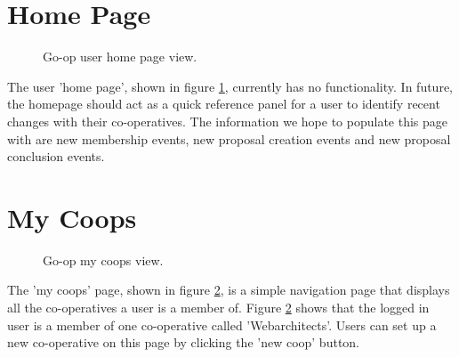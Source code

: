\section{Home Page}

\begin{figure}
\centering
{}
\decoRule
\caption[Go-op User Home Page View]{Go-op user home page view.}
\label{fig:homepage}
\end{figure}

The user 'home page', shown in figure \ref{fig:homepage}, currently has no functionality. In future, the homepage should act as a quick reference panel for a user to identify recent changes with their co-operatives. The information we hope to populate this page with are new membership events, new proposal creation events and new proposal conclusion events.\\
 
\section{My Coops}

\begin{figure}
\centering
{}
\decoRule
\caption[Go-op My Coops View]{Go-op my coops view.}
\label{fig:coopspage}
\end{figure}

The 'my coops' page, shown in figure \ref{fig:coopspage}, is a simple navigation page that displays all the co-operatives a user is a member of. Figure \ref{fig:coopspage} shows that the logged in user is a member of one co-operative called 'Webarchitects'. Users can set up a new co-operative on this page by clicking the 'new coop' button.\\

